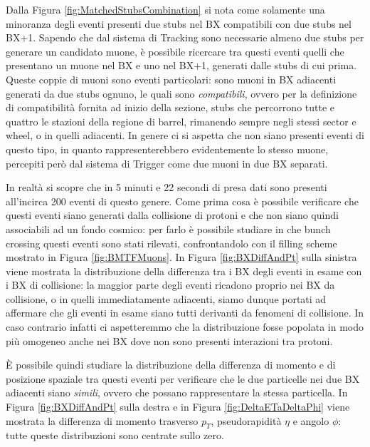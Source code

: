 Dalla Figura \ref{fig:MatchedStubsCombination} si nota come solamente una minoranza degli eventi presenti due stubs nel BX compatibili con due stubs nel BX+1. Sapendo che dal sistema di Tracking sono necessarie almeno due stubs per generare un candidato muone, è possibile ricercare tra questi eventi quelli che presentano un muone nel BX e uno nel BX+1, generati dalle stubs di cui prima. \newline
Queste coppie di muoni sono eventi particolari: sono muoni in BX adiacenti generati da due stubs ognuno, le quali sono \textit{compatibili}, ovvero per la definizione di compatibilità fornita ad inizio della sezione, stubs che percorrono tutte e quattro le stazioni della regione di barrel, rimanendo sempre negli stessi sector e wheel, o in quelli adiacenti. In genere ci si aspetta che non siano presenti eventi di questo tipo, in quanto rappresenterebbero evidentemente lo stesso muone, percepiti però dal sistema di Trigger come due muoni in due BX separati.

In realtà si scopre che in 5 minuti e 22 secondi di presa dati sono presenti all'incirca 200 eventi di questo genere. Come prima cosa è possibile verificare che questi eventi siano generati dalla collisione di protoni e che non siano quindi associabili ad un fondo cosmico: per farlo è possibile studiare in che bunch crossing questi eventi sono stati rilevati, confrontandolo con il filling scheme mostrato in Figura \ref{fig:BMTFMuons}. In Figura \ref{fig:BXDiffAndPt} sulla sinistra viene mostrata la distribuzione della differenza tra i BX degli eventi in esame con i BX di collisione: la maggior parte degli eventi ricadono proprio nei BX da collisione, o in quelli immediatamente adiacenti, siamo dunque portati ad affermare che gli eventi in esame siano tutti derivanti da fenomeni di collisione. In caso contrario infatti ci aspetteremmo che la distribuzione fosse popolata in modo più omogeneo anche nei BX dove non sono presenti interazioni tra protoni.

È possibile quindi studiare la distribuzione della differenza di momento e di posizione spaziale tra questi eventi per verificare che le due particelle nei due BX adiacenti siano \textit{simili}, ovvero che possano rappresentare la stessa particella. In Figura \ref{fig:BXDiffAndPt} sulla destra e in Figura \ref{fig:DeltaETaDeltaPhi} viene mostrata la differenza di momento trasverso $p_T$, pseudorapidità $\eta$ e  angolo $\phi$: tutte queste distribuzioni sono centrate sullo zero.



